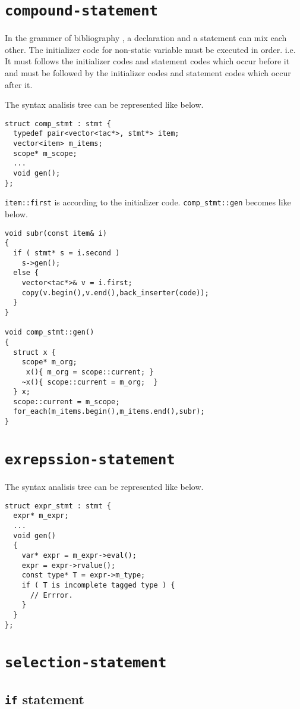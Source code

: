 \section{{\tt{compound-statement}}}

In the grammer of bibliography \cite{ISO}, a declaration and a statement
can mix each other. The initializer code for non-static variable must
be executed in order. i.e. It must follows the initializer codes and
statement codes which occur before it and must be followed by
the initializer codes and
statement codes which occur after it.

The syntax analisis tree can be represented like below.
\begin{verbatim}
struct comp_stmt : stmt {
  typedef pair<vector<tac*>, stmt*> item;
  vector<item> m_items;
  scope* m_scope;
  ...
  void gen();
};
\end{verbatim}
{\tt{item::first}} is according to the initializer code.
{\tt{comp\_stmt::gen}} becomes like below.
\begin{verbatim}
void subr(const item& i)
{
  if ( stmt* s = i.second )
    s->gen();
  else {
    vector<tac*>& v = i.first;
    copy(v.begin(),v.end(),back_inserter(code));
  }
}

void comp_stmt::gen()
{
  struct x {
    scope* m_org;
     x(){ m_org = scope::current; }
    ~x(){ scope::current = m_org;  }
  } x;
  scope::current = m_scope;
  for_each(m_items.begin(),m_items.end(),subr);
}
\end{verbatim}

\section{{\tt{exrepssion-statement}}}

The syntax analisis tree can be represented like below.
\begin{verbatim}
struct expr_stmt : stmt {
  expr* m_expr;
  ...
  void gen()
  {
    var* expr = m_expr->eval();
    expr = expr->rvalue();
    const type* T = expr->m_type;
    if ( T is incomplete tagged type ) {
      // Errror.
    }
  }
};
\end{verbatim}

\section{{\tt{selection-statement}}}

\subsection{{\tt{if}} statement}


